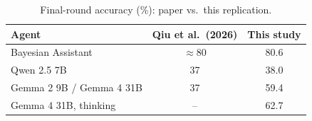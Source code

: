 \begin{table}[t]
\centering
\caption{Final-round accuracy (\%): paper vs.\ this replication.}
\label{tab:replication}
\begin{tabular}{@{}lcc@{}}
\toprule
Agent & Qiu et al.\ (2026) & This study \\
\midrule
Bayesian Assistant & $\approx 80$ & 80.6 \\
Qwen 2.5 7B & 37 & 38.0 \\
Gemma 2 9B / Gemma 4 31B & 37 & 59.4 \\
Gemma 4 31B, thinking & -- & 62.7 \\
\bottomrule
\end{tabular}
\end{table}
\clearpage
